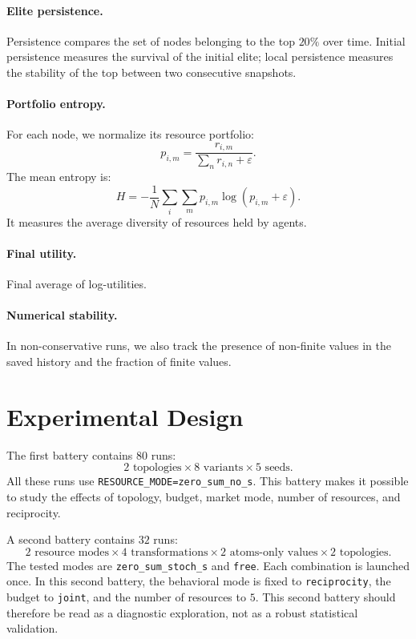 \documentclass[11pt]{article}
\begin{document}
\paragraph{Elite persistence.}
Persistence compares the set of nodes belonging to the top $20\%$ over time. Initial persistence measures the survival of the initial elite; local persistence measures the stability of the top between two consecutive snapshots.

\paragraph{Portfolio entropy.}
For each node, we normalize its resource portfolio:
\begin{equation}
    p_{i,m}=\frac{r_{i,m}}{\sum_n r_{i,n}+\varepsilon}.
\end{equation}
The mean entropy is:
\begin{equation}
    H=-\frac{1}{N}\sum_i\sum_m p_{i,m}\log(p_{i,m}+\varepsilon).
\end{equation}
It measures the average diversity of resources held by agents.

\paragraph{Final utility.}
Final average of log-utilities.

\paragraph{Numerical stability.}
In non-conservative runs, we also track the presence of non-finite values in the saved history and the fraction of finite values.

\section{Experimental Design}

The first battery contains $80$ runs:
\begin{equation}
    2 \text{ topologies} \times 8 \text{ variants} \times 5 \text{ seeds}.
\end{equation}
All these runs use \texttt{RESOURCE\_MODE=zero\_sum\_no\_s}. This battery makes it possible to study the effects of topology, budget, market mode, number of resources, and reciprocity.

A second battery contains $32$ runs:
\begin{equation}
    2 \text{ resource modes} \times 4 \text{ transformations}
    \times 2 \text{ atoms-only values} \times 2 \text{ topologies}.
\end{equation}
The tested modes are \texttt{zero\_sum\_stoch\_s} and \texttt{free}. Each combination is launched once. In this second battery, the behavioral mode is fixed to \texttt{reciprocity}, the budget to \texttt{joint}, and the number of resources to $5$. This second battery should therefore be read as a diagnostic exploration, not as a robust statistical validation.
\end{document}
